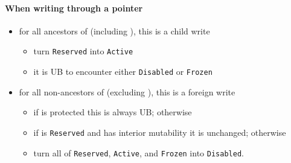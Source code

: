 \documentclass[a4paper,11pt]{article}
\theoremstyle{plain}
\theoremstyle{definition}
\theoremstyle{remark}
\newcommand{\tcode}[1]{\rstinline{#1}}
\newcommand{\tperm}[1]{\texttt{#1}}
\begin{document}
\paragraph*{When writing through a pointer \tcode{y}}
\begin{itemize}
    \item for all ancestors \tcode{x} of \tcode{y} (including \tcode{y}), this is a child write
        \begin{itemize}
            \item turn \tperm{Reserved} into \tperm{Active}
            \item it is UB to encounter either \tperm{Disabled} or \tperm{Frozen}
        \end{itemize}
    \item for all non-ancestors \tcode{z} of \tcode{y} (excluding \tcode{y}), this is a foreign write
        \begin{itemize}
            \item if \tcode{z} is protected this is always UB; otherwise
            \item if \tcode{z} is \tperm{Reserved} and has interior mutability it is unchanged; otherwise
            \item turn all of \tperm{Reserved}, \tperm{Active}, and \tperm{Frozen} into \tperm{Disabled}.
        \end{itemize}
\end{itemize}
\end{document}
